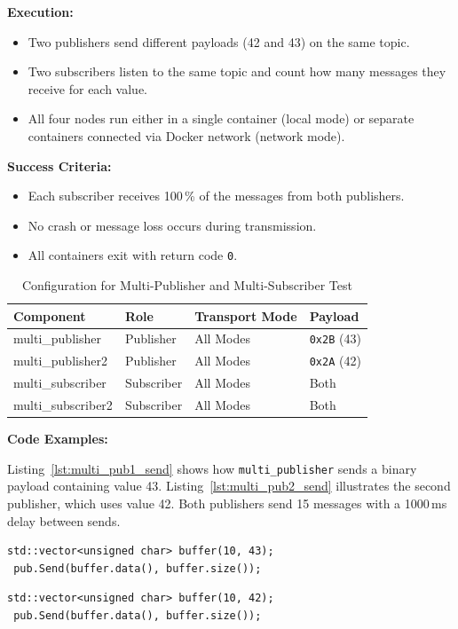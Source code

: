 \vspace{0.5em}
\textbf{Execution:}
\begin{itemize}
	\item Two publishers send different payloads (42 and 43) on the same topic.
	\item Two subscribers listen to the same topic and count how many messages they receive for each value.
	\item All four nodes run either in a single container (local mode) or separate containers connected via Docker network (network mode).
\end{itemize}

\textbf{Success Criteria:}
\begin{itemize}
	\item Each subscriber receives 100\,\% of the messages from both publishers.
	\item No crash or message loss occurs during transmission.
	\item All containers exit with return code \texttt{0}.
\end{itemize}

\begin{table}[H]
	\centering
	\begin{tabular}{@{}llll@{}}
		\toprule
		\textbf{Component}     & \textbf{Role}    & \textbf{Transport Mode} & \textbf{Payload} \\
		\midrule
		multi\_publisher       & Publisher        & All Modes               & \texttt{0x2B} (43) \\
		multi\_publisher2      & Publisher        & All Modes               & \texttt{0x2A} (42) \\
		multi\_subscriber      & Subscriber       & All Modes               & Both              \\
		multi\_subscriber2     & Subscriber       & All Modes               & Both              \\
		\bottomrule
	\end{tabular}
	\caption{Configuration for Multi-Publisher and Multi-Subscriber Test}
	\label{tab:multi_pub_sub_test}
\end{table}

\textbf{Code Examples:}
\vspace{0.4em}

Listing~\ref{lst:multi_pub1_send} shows how \texttt{multi\_publisher} sends a binary payload containing value 43. Listing~\ref{lst:multi_pub2_send} illustrates the second publisher, which uses value 42. Both publishers send 15 messages with a 1000\,ms delay between sends.
\vspace{0.5em}
\begin{lstlisting}[style=cppstyle, caption={Publisher 1 sends 0x2B (43)}, label={lst:multi_pub1_send}, captionpos=b]
 std::vector<unsigned char> buffer(10, 43);
 pub.Send(buffer.data(), buffer.size());
\end{lstlisting}
\vspace{0.5em}
\begin{lstlisting}[style=cppstyle, caption={Publisher 2 sends 0x2A (42)}, label={lst:multi_pub2_send}, captionpos=b]
 std::vector<unsigned char> buffer(10, 42);
 pub.Send(buffer.data(), buffer.size());
\end{lstlisting}

